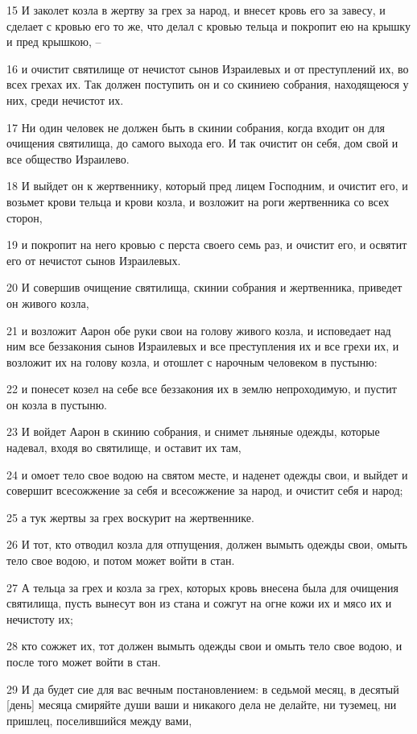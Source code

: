 \par 15 И заколет козла в жертву за грех за народ, и внесет кровь его за завесу, и сделает с кровью его то же, что делал с кровью тельца и покропит ею на крышку и пред крышкою, --
\par 16 и очистит святилище от нечистот сынов Израилевых и от преступлений их, во всех грехах их. Так должен поступить он и со скиниею собрания, находящеюся у них, среди нечистот их.
\par 17 Ни один человек не должен быть в скинии собрания, когда входит он для очищения святилища, до самого выхода его. И так очистит он себя, дом свой и все общество Израилево.
\par 18 И выйдет он к жертвеннику, который пред лицем Господним, и очистит его, и возьмет крови тельца и крови козла, и возложит на роги жертвенника со всех сторон,
\par 19 и покропит на него кровью с перста своего семь раз, и очистит его, и освятит его от нечистот сынов Израилевых.
\par 20 И совершив очищение святилища, скинии собрания и жертвенника, приведет он живого козла,
\par 21 и возложит Аарон обе руки свои на голову живого козла, и исповедает над ним все беззакония сынов Израилевых и все преступления их и все грехи их, и возложит их на голову козла, и отошлет с нарочным человеком в пустыню:
\par 22 и понесет козел на себе все беззакония их в землю непроходимую, и пустит он козла в пустыню.
\par 23 И войдет Аарон в скинию собрания, и снимет льняные одежды, которые надевал, входя во святилище, и оставит их там,
\par 24 и омоет тело свое водою на святом месте, и наденет одежды свои, и выйдет и совершит всесожжение за себя и всесожжение за народ, и очистит себя и народ;
\par 25 а тук жертвы за грех воскурит на жертвеннике.
\par 26 И тот, кто отводил козла для отпущения, должен вымыть одежды свои, омыть тело свое водою, и потом может войти в стан.
\par 27 А тельца за грех и козла за грех, которых кровь внесена была для очищения святилища, пусть вынесут вон из стана и сожгут на огне кожи их и мясо их и нечистоту их;
\par 28 кто сожжет их, тот должен вымыть одежды свои и омыть тело свое водою, и после того может войти в стан.
\par 29 И да будет сие для вас вечным постановлением: в седьмой месяц, в десятый [день] месяца смиряйте души ваши и никакого дела не делайте, ни туземец, ни пришлец, поселившийся между вами,
